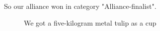 So our alliance won in category "Alliance-finalist".\newline
\begin{figure}[H]
	\begin{minipage}[h]{0.47\linewidth}
	\end{minipage}
	\hfill
	\begin{minipage}[h]{0.47\linewidth}
	\end{minipage}
	\caption{We got a five-kilogram metal tulip as a cup}
\end{figure}

